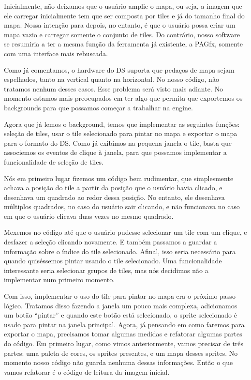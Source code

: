 \documentclass[brazil]{abnt}
\begin{document}
Inicialmente, não deixamos que o usuário amplie o mapa, ou seja, a imagem que ele carregar inicialmente tem que ser composta por tiles e já do tamanho final do mapa. Nossa intenção para depois, no entanto, é que o usuário possa criar um mapa vazio e carregar somente o conjunto de tiles. Do contrário, nosso software se resumiria a ter a mesma função da ferramenta já existente, a PAGfx, somente com uma interface mais rebuscada.

Como já comentamos, o hardware do DS suporta que pedaços de mapa sejam espelhados, tanto na vertical quanto na horizontal. No nosso código, não tratamos nenhum desses casos. Esse problema será visto mais adiante. No momento estamos mais preocupados em ter algo que permita que exportemos os backgrounds para que possamos começar a trabalhar na engine.

Agora que já lemos o background, temos que implementar as seguintes funções: seleção de tiles, usar o tile selecionado para pintar no mapa e exportar o mapa para o formato do DS. Como já exibimos na pequena janela o tile, basta que associemos os eventos de clique à janela, para que possamos implementar a funcionalidade de seleção de tiles.

Nós em primeiro lugar fizemos um código bem rudimentar, que simplesmente achava a posição do tile a partir da posição que o usuário havia clicado, e desenhava um quadrado ao redor dessa posição. No entanto, ele desenhava múltiplos quadrados, no caso do usuário sair clicando, e não funcionava no caso em que o usuário clicava duas vezes no mesmo quadrado.

Mexemos no código até que o usuário pudesse selecionar um tile com um clique, e desfazer a seleção clicando novamente. E também passamos a guardar a informação sobre o índice do tile selecionado. Afinal, isso seria necessário para quando quiséssemos pintar usando o tile selecionado. Uma funcionalidade interessante seria selecionar grupos de tiles, mas nós decidimos não a implementar num primeiro momento.

Com isso, implementar o uso do tile para pintar no mapa era o próximo passo lógico. Tratamos disso fazendo a janela um pouco mais complexa, adicionamos um botão ``pintar'' e quando este botão está selecionado, o sprite selecionado é usado para pintar na janela principal. Agora, já pensando em como faremos para exportar o mapa, precisamos tomar algumas medidas e refatorar algumas partes do código. Em primeiro lugar, como vimos anteriormente, vamos precisar de três partes: uma paleta de cores, os sprites presentes, e um mapa desses sprites. No momento nosso código não guarda nenhuma dessas informações. Então o que vamos refatorar é o código de leitura da imagem inicial.
\end{document}
